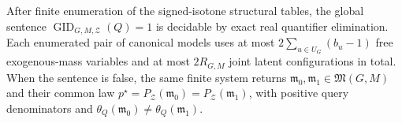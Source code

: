 After finite enumeration of the signed-isotone structural tables, the global sentence \(\operatorname{GID}_{G,M,\mathcal Z}(Q)=1\) is decidable by exact real quantifier elimination. Each enumerated pair of canonical models uses at most \(2\sum_{u\in U_G}(b_u-1)\) free exogenous-mass variables and at most \(2R_{G,M}\) joint latent configurations in total. When the sentence is false, the same finite system returns \(\mathfrak m_0,\mathfrak m_1\in\mathfrak M(G,M)\) and their common law \(p^{\star}=P_{\mathcal Z}(\mathfrak m_0)=P_{\mathcal Z}(\mathfrak m_1)\), with positive query denominators and \(\theta_Q(\mathfrak m_0)\ne\theta_Q(\mathfrak m_1)\).